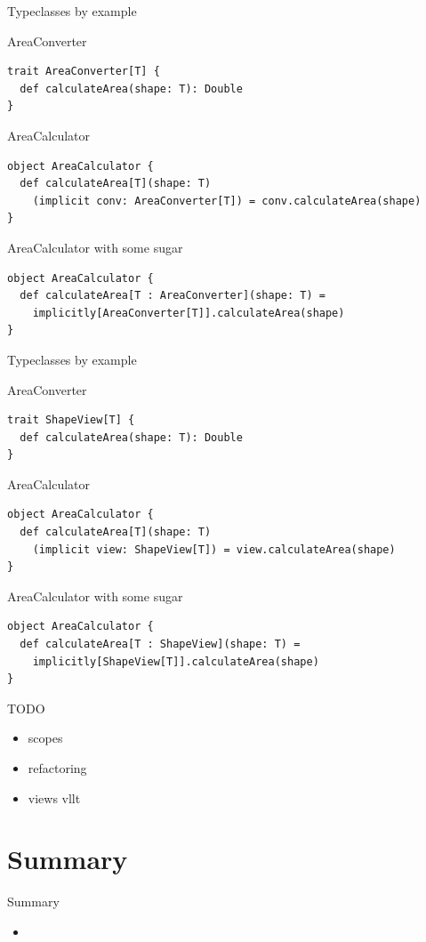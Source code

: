\begin{frame}[fragile]{Typeclasses by example}
\begin{exampleblock}{AreaConverter}
\begin{lstlisting}
trait AreaConverter[T] {
  def calculateArea(shape: T): Double
}
\end{lstlisting}
\end{exampleblock}
\begin{exampleblock}{AreaCalculator}
\begin{lstlisting}
object AreaCalculator {
  def calculateArea[T](shape: T)
    (implicit conv: AreaConverter[T]) = conv.calculateArea(shape)
}
\end{lstlisting}
\end{exampleblock}
\begin{exampleblock}{AreaCalculator with some sugar}
\begin{lstlisting}
object AreaCalculator {
  def calculateArea[T : AreaConverter](shape: T) =
    implicitly[AreaConverter[T]].calculateArea(shape)
}
\end{lstlisting}
\end{exampleblock}
\end{frame}

\begin{frame}[fragile]{Typeclasses by example}
\begin{exampleblock}{AreaConverter}
\begin{lstlisting}
trait ShapeView[T] {
  def calculateArea(shape: T): Double
}
\end{lstlisting}
\end{exampleblock}
\begin{exampleblock}{AreaCalculator}
\begin{lstlisting}
object AreaCalculator {
  def calculateArea[T](shape: T)
    (implicit view: ShapeView[T]) = view.calculateArea(shape)
}
\end{lstlisting}
\end{exampleblock}
\begin{exampleblock}{AreaCalculator with some sugar}
\begin{lstlisting}
object AreaCalculator {
  def calculateArea[T : ShapeView](shape: T) =
    implicitly[ShapeView[T]].calculateArea(shape)
}
\end{lstlisting}
\end{exampleblock}
\end{frame}

\begin{frame}{TODO}
\begin{itemize}
  \item scopes
  \item refactoring
  \item views vllt
\end{itemize}
\end{frame}

\section{Summary}
\begin{frame}{Summary}
\begin{itemize}
  \item
\end{itemize}
\end{frame}